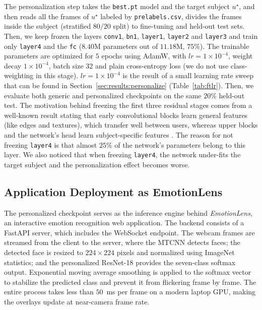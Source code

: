 \documentclass[12pt,a4paper]{article}
\begin{document}
The personalization step takes the \texttt{best.pt} model and
the target subject $u^\star$, and then reads all the frames of
$u^\star$ labeled by \texttt{prelabels.csv}, divides the frames
inside the subject (stratified $80/20$ split) to fine-tuning and
held-out test sets. Then, we keep frozen the layers
\texttt{conv1}, \texttt{bn1}, \texttt{layer1}, \texttt{layer2}
and \texttt{layer3} and train only \texttt{layer4} and the
\texttt{fc} ($8.40$M parameters out of $11.18$M, $75\%$). The
trainable parameters are optimized for $5$ epochs using AdamW,
with $lr = 1 \times 10^{-4}$, weight decay $1 \times 10^{-4}$,
batch size $32$ and plain cross-entropy loss (we do not use
class-weighting in this stage). $lr = 1 \times 10^{-4}$ is the
result of a small learning rate sweep that can be found in
Section~\ref{sec:results:personalize}
(Table~\ref{tab:ftlr}). Then, we evaluate both generic and
personalized checkpoints on the same $20\%$ held-out test. The
motivation behind freezing the first three residual stages comes
from a well-known result stating that early convolutional blocks
learn general features (like edges and textures), which transfer
well between users, whereas upper blocks and the network's head
learn subject-specific features
\autocite{finn2017maml, ganin2015dann}. The reason for not
freezing \texttt{layer4} is that almost $25\%$ of the network's
parameters belong to this layer. We also noticed that when
freezing \texttt{layer4}, the network under-fits the target
subject and the personalization effect becomes worse.

\subsection{Application Deployment as EmotionLens}
\label{sec:impl:deploy}

The personalized checkpoint serves as the inference engine
behind \emph{EmotionLens}, an interactive emotion recognition
web application. The backend consists of a FastAPI server, which
includes the WebSocket endpoint. The webcam frames are streamed
from the client to the server, where the MTCNN
\autocite{zhang2016mtcnn} detects faces; the detected face is
resized to $224 \times 224$ pixels and normalized using ImageNet
statistics; and the personalized ResNet-18 provides the
seven-class softmax output. Exponential moving average smoothing
is applied to the softmax vector to stabilize the predicted
class and prevent it from flickering frame by frame. The entire
process takes less than $50$~ms per frame on a modern laptop
GPU, making the overlays update at near-camera frame rate.
\end{document}

